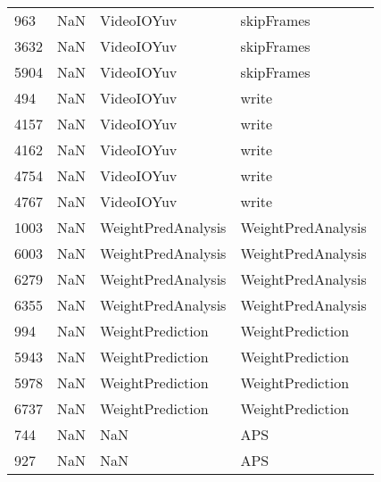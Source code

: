 \begin{tabular}{llll}
963  &                   NaN &                 VideoIOYuv &                                skipFrames \\
3632 &                   NaN &                 VideoIOYuv &                                skipFrames \\
5904 &                   NaN &                 VideoIOYuv &                                skipFrames \\
494  &                   NaN &                 VideoIOYuv &                                     write \\
4157 &                   NaN &                 VideoIOYuv &                                     write \\
4162 &                   NaN &                 VideoIOYuv &                                     write \\
4754 &                   NaN &                 VideoIOYuv &                                     write \\
4767 &                   NaN &                 VideoIOYuv &                                     write \\
1003 &                   NaN &         WeightPredAnalysis &                        WeightPredAnalysis \\
6003 &                   NaN &         WeightPredAnalysis &                        WeightPredAnalysis \\
6279 &                   NaN &         WeightPredAnalysis &                        WeightPredAnalysis \\
6355 &                   NaN &         WeightPredAnalysis &                        WeightPredAnalysis \\
994  &                   NaN &           WeightPrediction &                          WeightPrediction \\
5943 &                   NaN &           WeightPrediction &                          WeightPrediction \\
5978 &                   NaN &           WeightPrediction &                          WeightPrediction \\
6737 &                   NaN &           WeightPrediction &                          WeightPrediction \\
744  &                   NaN &                        NaN &                                       APS \\
927  &                   NaN &                        NaN &                                       APS \\

\end{tabular}
